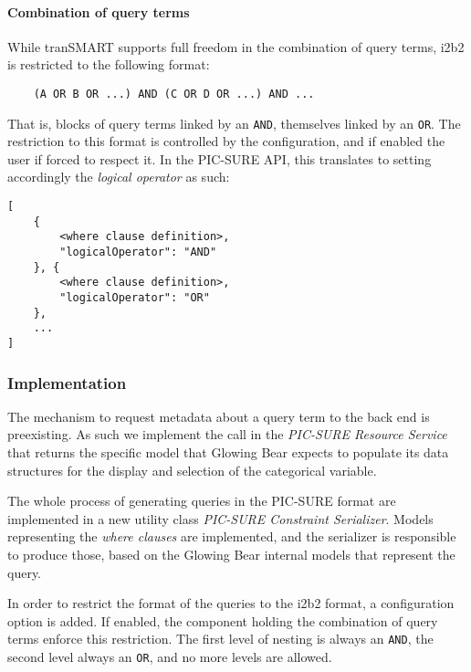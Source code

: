 \paragraph{Combination of query terms}
While tranSMART supports full freedom in the combination of query terms, i2b2 is restricted to the following format:
\begin{verbatim}
    (A OR B OR ...) AND (C OR D OR ...) AND ...
\end{verbatim}
That is, blocks of query terms linked by an \verb|AND|, themselves linked by an \verb|OR|.
The restriction to this format is controlled by the configuration, and if enabled the user if forced to respect it.
In the PIC-SURE API, this translates to setting accordingly the \emph{logical operator} as such:
\begin{samepage}
\begin{verbatim}
[
    { 
        <where clause definition>,
        "logicalOperator": "AND"
    }, {
        <where clause definition>,
        "logicalOperator": "OR"
    },
    ...
]
\end{verbatim}
\end{samepage}



\subsubsection{Implementation}

The mechanism to request metadata about a query term to the back end is preexisting.
As such we implement the call in the \emph{PIC-SURE Resource Service} that returns the specific model that Glowing Bear expects to populate its data structures for the display and selection of the categorical variable.

The whole process of generating queries in the PIC-SURE format are implemented in a new utility class \emph{PIC-SURE Constraint Serializer}.
Models representing the \emph{where clauses} are implemented, and the serializer is responsible to produce those, based on the Glowing Bear internal models that represent the query.

In order to restrict the format of the queries to the i2b2 format, a configuration option is added.
If enabled, the component holding the combination of query terms enforce this restriction.
The first level of nesting is always an \verb|AND|, the second level always an \verb|OR|, and no more levels are allowed.


